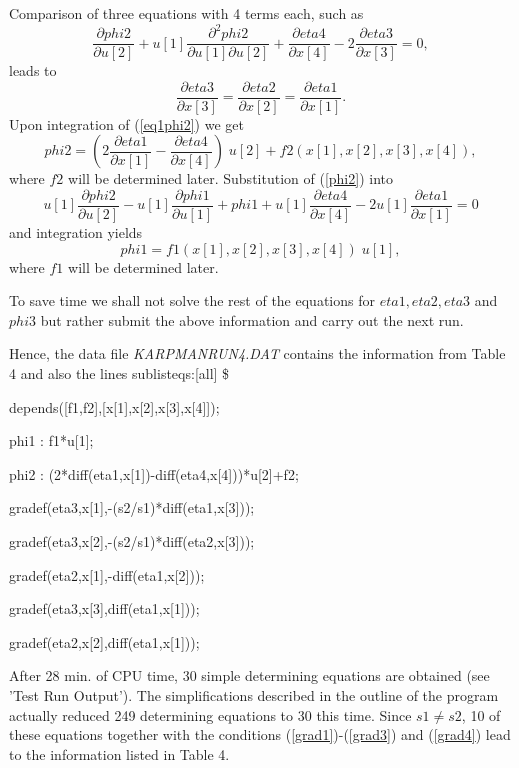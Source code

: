 {\nopagebreak
Comparison of three equations with 4 terms each, such as
\begin{equation}
\frac{\partial phi2}{\partial u[2]} 
+ u[1] \frac{\partial^2 phi2}{\partial u[1] \partial u[2]} 
+ \frac{\partial eta4}{\partial x[4]}
- 2 \frac{\partial eta3}{\partial x[3]} = 0,
\label{eq1phi2}
\end{equation}
leads to 
\begin{equation}
\frac{\partial eta3}{\partial x[3]}= \frac{\partial eta2}{\partial x[2]} = 
\frac{\partial eta1}{\partial x[1]}.
\label{grad4}
\end{equation}
Upon integration of (\ref{eq1phi2}) we get
\begin{equation}
phi2 = (2 \frac{\partial eta1}{\partial x[1]} 
- \frac{\partial eta4}{\partial x[4]} ) \; u[2]  
+ f2 (x[1], x[2], x[3], x[4]),
\label{phi2}
\end{equation}
where  $f2$ will be determined later.
\vskip 1pt
\noindent
Substitution of (\ref{phi2}) into
\begin{equation}
u[1] \frac{\partial phi2}{\partial u[2]} 
- u[1] \frac{\partial phi1}{\partial u[1]} + phi1 
+ u[1] \frac{\partial eta4}{\partial x[4]}
- 2 u[1]  \frac{\partial eta1}{\partial x[1]}
= 0
\label{eq1phi1}
\end{equation}
and integration yields
\begin{equation}
phi1 = f1(x[1], x[2], x[3], x[4]) \; u[1],
\label{phi1}
\end{equation}
where $f1$ will be determined later.
\vskip 1pt

\nopagebreak
To save time we shall not solve the rest of the equations for 
$eta1, eta2, eta3$ and $phi3$ 
but rather submit the above information and carry out the next run.

\nopagebreak
Hence, the data file {\em KARPMANRUN4.DAT} contains
the information from Table 4 and also the lines
\vskip 2pt
\pagebreak
sublisteqs:[all] \$ \par
depends([f1,f2],[x[1],x[2],x[3],x[4]]); \par
phi1 : f1*u[1]; \par
phi2 : (2*diff(eta1,x[1])-diff(eta4,x[4]))*u[2]+f2; \par
gradef(eta3,x[1],-(s2/s1)*diff(eta1,x[3])); \par
gradef(eta3,x[2],-(s2/s1)*diff(eta2,x[3])); \par
gradef(eta2,x[1],-diff(eta1,x[2])); \par
gradef(eta3,x[3],diff(eta1,x[1])); \par
gradef(eta2,x[2],diff(eta1,x[1])); \par
\vskip 2pt
\noindent
\nopagebreak
After 28 min. of CPU time, 30 simple determining equations are obtained
(see 'Test Run Output'). 
The simplifications described in the outline of the program 
actually reduced 249 determining equations to 30 this time.
\vskip 1pt
\noindent
Since $s1 \not= s2$, 10 of these equations together with the
conditions (\ref{grad1})-(\ref{grad3}) and (\ref{grad4}) 
lead to the information listed in Table 4.

}

